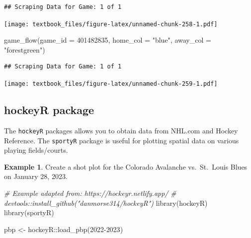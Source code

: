 \documentclass[
  11pt,
]{book}
\newenvironment{Shaded}{\begin{snugshade}}{\end{snugshade}}
\newcommand{\AttributeTok}[1]{\textcolor[rgb]{0.77,0.63,0.00}{#1}}
\newcommand{\CommentTok}[1]{\textcolor[rgb]{0.56,0.35,0.01}{\textit{#1}}}
\newcommand{\DecValTok}[1]{\textcolor[rgb]{0.00,0.00,0.81}{#1}}
\newcommand{\FunctionTok}[1]{\textcolor[rgb]{0.00,0.00,0.00}{#1}}
\newcommand{\NormalTok}[1]{#1}
\newcommand{\OtherTok}[1]{\textcolor[rgb]{0.56,0.35,0.01}{#1}}
\newcommand{\SpecialCharTok}[1]{\textcolor[rgb]{0.00,0.00,0.00}{#1}}
\newcommand{\StringTok}[1]{\textcolor[rgb]{0.31,0.60,0.02}{#1}}
\theoremstyle{definition}
\theoremstyle{definition}
\newtheorem{example}{Example}[chapter]
\theoremstyle{definition}
\theoremstyle{definition}
\theoremstyle{remark}
\begin{document}
\begin{verbatim}
## Scraping Data for Game: 1 of 1
\end{verbatim}

\texttt{[image: textbook\_files/figure-latex/unnamed-chunk-258-1.pdf]}
\newpage

\begin{Shaded}
\begin{Highlighting}[]
\FunctionTok{game\_flow}\NormalTok{(}\AttributeTok{game\_id =} \DecValTok{401482835}\NormalTok{, }\AttributeTok{home\_col =} \StringTok{"blue"}\NormalTok{, }\AttributeTok{away\_col =} \StringTok{"forestgreen"}\NormalTok{)}
\end{Highlighting}
\end{Shaded}

\begin{verbatim}
## Scraping Data for Game: 1 of 1
\end{verbatim}

\texttt{[image: textbook\_files/figure-latex/unnamed-chunk-259-1.pdf]}

\newpage

\hypertarget{hockeyr-package}{%
\subsection{hockeyR package}\label{hockeyr-package}}

The \texttt{hockeyR} packages allows you to obtain data from NHL.com and Hockey Reference. The \texttt{sportyR} package is useful for plotting spatial data on various playing fields/courts.

\begin{example}
Create a shot plot for the Colorado Avalanche vs.~St.~Louis Blues on January 28, 2023.
\end{example}

\begin{Shaded}
\begin{Highlighting}[]
\CommentTok{\# Example adapted from: https://hockeyr.netlify.app/}
\CommentTok{\# devtools::install\_github("danmorse314/hockeyR")}
\FunctionTok{library}\NormalTok{(hockeyR)}
\FunctionTok{library}\NormalTok{(sportyR)}

\NormalTok{pbp }\OtherTok{\textless{}{-}}\NormalTok{ hockeyR}\SpecialCharTok{::}\FunctionTok{load\_pbp}\NormalTok{(}\StringTok{\textquotesingle{}2022{-}2023\textquotesingle{}}\NormalTok{)}
\end{Highlighting}
\end{Shaded}
\end{document}
